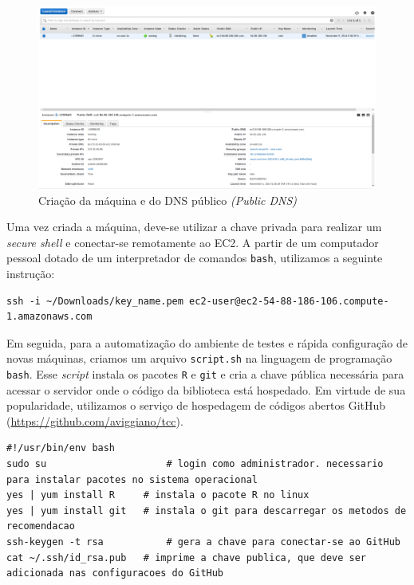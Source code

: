\begin{figure}[htp]
    \begin{center}
    \includegraphics[width=1\textwidth]{img/aws_setup_dns}
    \end{center}
    \caption{Criação da máquina e do DNS público \textit{(Public DNS)}}
    \label{fig:aws_setup_dns}
\end{figure}



Uma vez criada a máquina, deve-se utilizar a chave privada para realizar um \textit{secure shell} e conectar-se remotamente ao EC2. A partir de um computador pessoal dotado de um interpretador de comandos \texttt{bash}, utilizamos a seguinte instrução:

\begin{lstlisting}[caption=Secure shell para conexão com a máquina virtual EC2]
ssh -i ~/Downloads/key_name.pem ec2-user@ec2-54-88-186-106.compute-1.amazonaws.com
\end{lstlisting}

Em seguida, para a automatização do ambiente de testes e rápida configuração de novas máquinas, criamos um arquivo \texttt{script.sh} na linguagem de programação \texttt{bash}. Esse \textit{script} instala os pacotes \texttt{R} e \texttt{git} e cria a chave pública necessária para acessar o servidor onde o código da biblioteca está hospedado. Em virtude de sua popularidade, utilizamos o serviço de hospedagem de códigos abertos GitHub (\url{https://github.com/aviggiano/tcc}). 

\begin{lstlisting}[caption=\textit{Script} de configuração do ambiente de testes]
#!/usr/bin/env bash
sudo su						# login como administrador. necessario para instalar pacotes no sistema operacional
yes | yum install R		# instala o pacote R no linux
yes | yum install git	# instala o git para descarregar os metodos de recomendacao
ssh-keygen -t rsa			# gera a chave para conectar-se ao GitHub
cat ~/.ssh/id_rsa.pub	# imprime a chave publica, que deve ser adicionada nas configuracoes do GitHub
\end{lstlisting}

